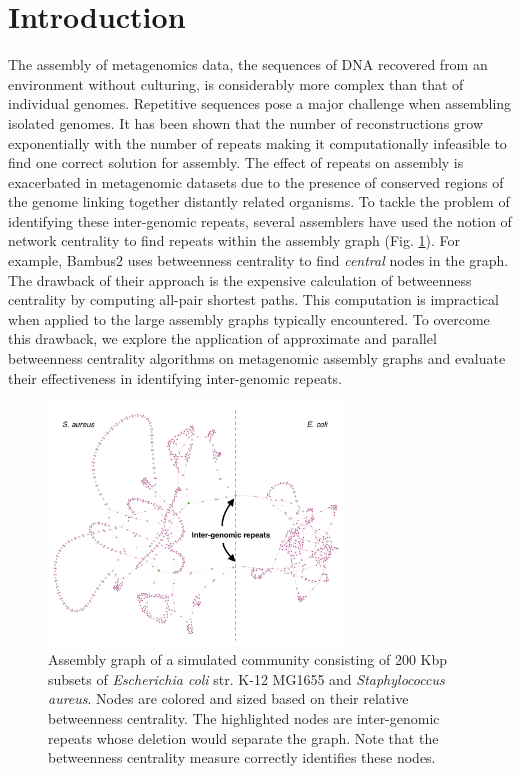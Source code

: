 \documentclass[runningheads,a4paper]{llncs}
\begin{document}
\section{Introduction}

The assembly of metagenomics data, the sequences of DNA recovered from an environment without culturing, is considerably more complex than that of individual genomes.
Repetitive sequences pose a major challenge when assembling isolated genomes.
It has been shown that the number of reconstructions grow exponentially with the number of repeats making it computationally infeasible to find one correct solution for assembly\cite{kingsford}.
The effect of repeats on assembly is exacerbated in metagenomic datasets due to the presence of conserved regions of the genome linking together distantly related organisms.
To tackle the problem of identifying these inter-genomic repeats, several assemblers have used the notion of network centrality to find repeats within the assembly graph (Fig. \ref{fig:es_mix}).
For example, Bambus2\cite{bambus} uses betweenness centrality to find \emph{central} nodes in the graph.
The drawback of their approach is the expensive calculation of betweenness centrality by computing all-pair shortest paths.
This computation is impractical when applied to the large assembly graphs typically encountered.
To overcome this drawback, we explore the application of approximate and parallel betweenness centrality algorithms on metagenomic assembly graphs and evaluate their effectiveness in identifying inter-genomic repeats.

\begin{figure}[htbp]
\centering
\includegraphics[width=0.70\textwidth]{es_mix_200kb_k21.png}
\caption{Assembly graph of a simulated community consisting of 200 Kbp subsets of \textit{Escherichia coli} str. K-12 MG1655 and \textit{Staphylococcus aureus}.  Nodes are colored and sized based on their relative betweenness centrality. The highlighted nodes are inter-genomic repeats whose deletion would separate the graph. Note that the betweenness centrality measure correctly identifies these nodes.}
\label{fig:es_mix}
\end{figure}
\end{document}
